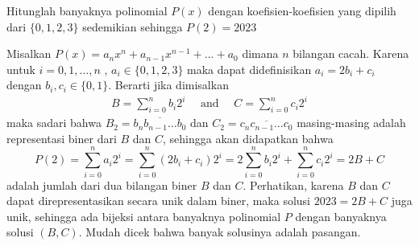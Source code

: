 \documentclass[12pt]{scrartcl}
\begin{document}
\begin{soaljawab}
    Hitunglah banyaknya polinomial $P(x)$ dengan koefisien-koefisien yang dipilih dari $\{0, 1, 2, 3\}$ sedemikian sehingga $P(2) = 2023$
    \begin{solusi}
    Misalkan $P(x)=a_nx^n+a_{n-1}x^{n-1} + \dots + a_0$ dimana $n$ bilangan cacah. Karena untuk $i=0,1,\dots,n$ , $a_i \in \{0,1,2,3\}$ maka dapat didefinisikan $a_i = 2b_i+c_i$ dengan $b_i,c_i \in \{0,1\}$. Berarti jika dimisalkan
    \begin{align*}
        B = \sum_{i = 0}^{n}b_i2^{i} \quad \text{ and } \quad C = \sum_{i = 0}^{n} c_i2^{i}
    \end{align*}
    maka sadari bahwa $B_2 = \overline{b_nb_{n-1}\ldots b_0}$ dan $C_2 = \overline{c_nc_{n-1} \ldots c_0}$ masing-masing adalah representasi biner dari $B$ dan $C$, sehingga akan didapatkan bahwa
    $$P(2) = \sum_{i = 0}^{n} a_i2^i = \sum_{i = 0}^{n} (2b_i+c_i)2^i = 2\sum_{i = 0}^{n}b_i2^i + \sum_{i = 0}^{n} c_i2^i = 2B+C$$
    adalah jumlah dari dua bilangan biner $B$ dan $C$. Perhatikan, karena $B$ dan $C$ dapat direpresentasikan secara unik dalam biner, maka solusi $2023 = 2B+C$ juga unik, sehingga ada bijeksi antara banyaknya polinomial $P$ dengan banyaknya solusi $(B,C)$. Mudah dicek bahwa banyak solusinya adalah  pasangan.
    \end{solusi}
\end{soaljawab}
\end{document}
